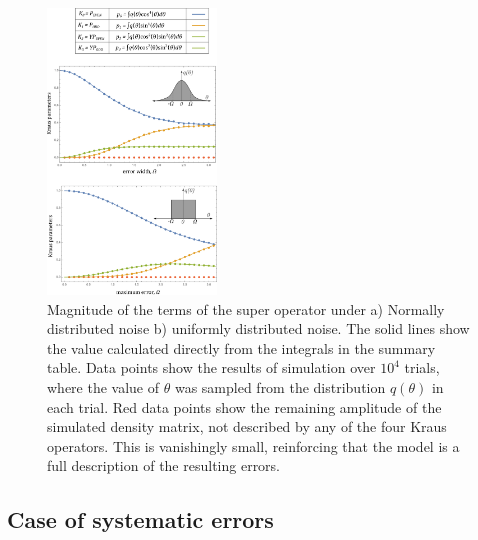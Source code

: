 \documentclass[prl, twocolumn, ,superscriptaddress]{revtex4-1}
\begin{document}
\begin{figure}
\includegraphics[width=0.4\textwidth]{single_qubit_plots_1.pdf}
\caption{Magnitude of the terms of the super operator under a) Normally distributed noise b) uniformly distributed noise. The solid lines show the value calculated directly from the integrals in the summary table. Data points show the results of simulation over $10^4$ trials, where the value of $\theta$ was sampled from the distribution $q(\theta)$ in each trial. Red data points show the remaining amplitude of the simulated density matrix, not described by any of the four Kraus operators. This is vanishingly small, reinforcing that the model is a full description of the resulting errors.}
\label{table:superoperator}
\end{figure}

%
%


\subsection{Case of systematic errors }
\end{document}
